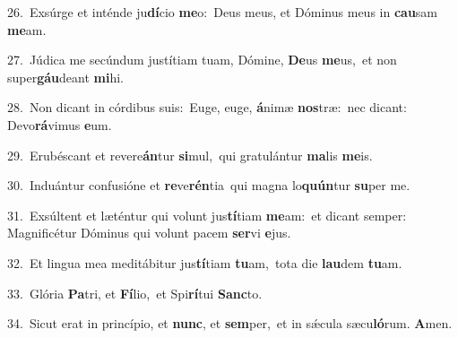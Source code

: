 {\numbfont\textcolor{\numbcolor}{26.}}~Exsúrge et inténde ju\-\textbf{dí}\-cio \textbf{me}\-o:~\star Deus meus, et Dóminus meus in \textbf{cau}\-sam \textbf{me}\-am.\par
{\numbfont\textcolor{\numbcolor}{27.}}~Júdica me secúndum justítiam tuam, Dómine, \textbf{De}\-us \textbf{me}\-us,~\star et non super\-\textbf{gáu}\-deant \textbf{mi}\-hi.\par
{\numbfont\textcolor{\numbcolor}{28.}}~Non dicant in córdibus suis:~\dagger Euge, euge, \textbf{á}\-nimæ \textbf{nos}\-træ:~\star nec dicant: Devo\-\textbf{rá}\-vimus \textbf{e}\-um.\par
{\numbfont\textcolor{\numbcolor}{29.}}~Erubéscant et revere\-\textbf{án}\-tur \textbf{si}\-mul,~\star qui gratulántur \textbf{ma}\-lis \textbf{me}\-is.\par
{\numbfont\textcolor{\numbcolor}{30.}}~Induántur confusióne et \textbf{re}\-ve\-\textbf{rén}\-tia~\star qui magna lo\-\textbf{quún}\-tur \textbf{su}\-per me.\par
{\numbfont\textcolor{\numbcolor}{31.}}~Exsúltent et læténtur qui volunt jus\-\textbf{tí}\-tiam \textbf{me}\-am:~\star et dicant semper: Magnificétur Dóminus qui volunt pacem \textbf{ser}\-vi \textbf{e}\-jus.\par
{\numbfont\textcolor{\numbcolor}{32.}}~Et lingua mea meditábitur jus\-\textbf{tí}\-tiam \textbf{tu}\-am,~\star tota die \textbf{lau}\-dem \textbf{tu}\-am.\par
{\numbfont\textcolor{\numbcolor}{33.}}~Glória \textbf{Pa}\-tri, et \textbf{Fí}\-lio,~\star et Spi\-\textbf{rí}\-tui \textbf{Sanc}\-to.\par
{\numbfont\textcolor{\numbcolor}{34.}}~Sicut erat in princípio, et \textbf{nunc}\-, et \textbf{sem}\-per,~\star et in sǽcula sæcu\-\textbf{ló}\-rum. \textbf{A}\-men.\par
